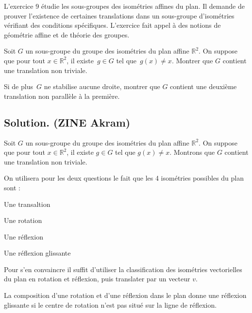 L'exercice 9 {\'e}tudie les sous-groupes des isom{\'e}tries affines du plan.
Il demande de prouver l'existence de certaines translations dans un
sous-groupe d'isom{\'e}tries v{\'e}rifiant des conditions sp{\'e}cifiques.
L'exercice fait appel {\`a} des notions de g{\'e}om{\'e}trie affine et de
th{\'e}orie des groupes.
\begin{exercise}
Soit $G$ un sous-groupe du groupe des isom{\'e}tries du plan affine
$\mathbb{R}^2$. On suppose que pour tout $x \in \mathbb{R}^2$, il existe~$g
\in G$ tel que~$g (x) \neq x$. Montrer que $G$ contient une translation non
triviale.

Si de plus~$G$ ne stabilise aucune droite, montrer que $G$ contient une
deuxi{\`e}me translation non parall{\`e}le {\`a} la premi{\`e}re.

\end{exercise}

\subsection*{Solution. (ZINE Akram)}

Soit $G$ un sous-groupe du groupe des isom{\'e}tries du plan affine
$\mathbb{R}^2$. On suppose que pour tout $x \in \mathbb{R}^2$, il existe $g
\in G$ tel que $g (x) \neq x$. Montrons que $G$ contient une translation non
triviale.

On utilisera pour les deux questions le fait que les 4 isom{\'e}tries
possibles du plan sont :
\begin{enumeratenumeric}
  \item Une transaltion
  
  \item Une rotation
  
  \item Une r{\'e}flexion
  
  \item Une r{\'e}flexion glissante
\end{enumeratenumeric}


Pour s'en convaincre il suffit d'utiliser la classification des isom{\'e}tries
vectorielles du plan en rotation et r{\'e}flexion, puis translater par un
vecteur $v$.


La composition d'une rotation et d'une r{\'e}flexion dans le plan donne une
r{\'e}flexion glissante si le centre de rotation n'est pas situ{\'e} sur la
ligne de r{\'e}flexion.

